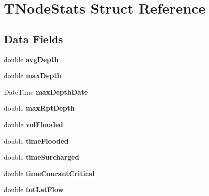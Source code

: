 \hypertarget{struct_t_node_stats}{}\section{T\+Node\+Stats Struct Reference}
\label{struct_t_node_stats}
\subsection*{Data Fields}
\begin{DoxyCompactItemize}
\item 
\mbox{\label{struct_t_node_stats_a3979832c72553371cbc7cf5bc3c9913b}} 
double {\bfseries avg\+Depth}
\item 
\mbox{\label{struct_t_node_stats_a6a4fdafe2923ec0b425ce0041a23119b}} 
double {\bfseries max\+Depth}
\item 
\mbox{\label{struct_t_node_stats_a5ca0658138728eb23a9c37f104f80cb5}} 
Date\+Time {\bfseries max\+Depth\+Date}
\item 
\mbox{\label{struct_t_node_stats_a9e74c6377cb0be84bc101a2a1691a31d}} 
double {\bfseries max\+Rpt\+Depth}
\item 
\mbox{\label{struct_t_node_stats_a92cd2aeb03cc8b788d690e6d9c092cf5}} 
double {\bfseries vol\+Flooded}
\item 
\mbox{\label{struct_t_node_stats_aa47a570ca31741760575ed54d0699763}} 
double {\bfseries time\+Flooded}
\item 
\mbox{\label{struct_t_node_stats_a5fb251ab511b532ceef472c2c81bd67f}} 
double {\bfseries time\+Surcharged}
\item 
\mbox{\label{struct_t_node_stats_af60e38350648791e54291df996712fc0}} 
double {\bfseries time\+Courant\+Critical}
\item 
\mbox{\label{struct_t_node_stats_ab822b0bb40146d25d5a83bdc23c3a1d6}} 
double {\bfseries tot\+Lat\+Flow}
\item 
\mbox{\label{struct_t_node_stats_a4f4cc197f5f2cc766362a47be100ba6e}} 

\end{DoxyCompactItemize}
